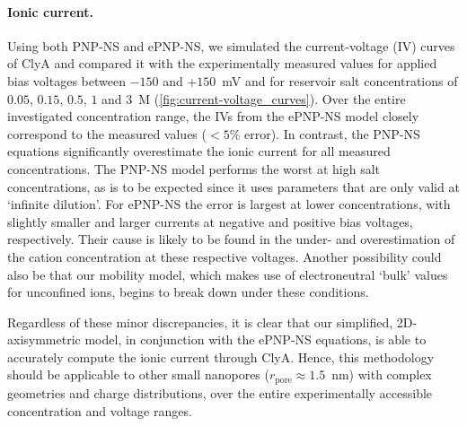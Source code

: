 \documentclass[journal=ancac3,manuscript=article,etalmode=truncate,maxauthors=0,layout=twocolumn]{achemso}
\begin{document}

\paragraph{Ionic current.}
Using both PNP-NS and ePNP-NS, we simulated the current-voltage (IV) curves of ClyA and compared it with the 
experimentally measured values for applied bias voltages between $-150$ and $+150$~mV and for reservoir salt 
concentrations of $0.05$, $0.15$, $0.5$, $1$ and $3$~M (\cref{fig:current-voltage_curves}). Over the entire 
investigated concentration range, the IVs from the ePNP-NS model closely correspond to the measured values 
($<5\%$ error). In contrast, the PNP-NS equations significantly overestimate the ionic current for all 
measured concentrations. The PNP-NS model performs the worst at high salt concentrations, as is to be 
expected since it uses parameters that are only valid at `infinite dilution'. For ePNP-NS the error is 
largest at lower concentrations, with slightly smaller and larger currents at negative and positive bias 
voltages, respectively. Their cause is likely to be found in the under- and overestimation of the cation 
concentration at these respective voltages. Another possibility could also be that our mobility 
model, which makes use of electroneutral `bulk' values for unconfined ions, begins to break down under these 
conditions.\cite{Duan-2010}

Regardless of these minor discrepancies, it is clear that our simplified, 2D-axisymmetric model, in 
conjunction with the ePNP-NS equations, is able to accurately compute the ionic current through ClyA. Hence, 
this methodology should be applicable to other small nanopores ($r_{\text{pore}}\approx1.5$~nm) with complex 
geometries and charge distributions, over the entire experimentally accessible concentration and voltage 
ranges.

\end{document}
